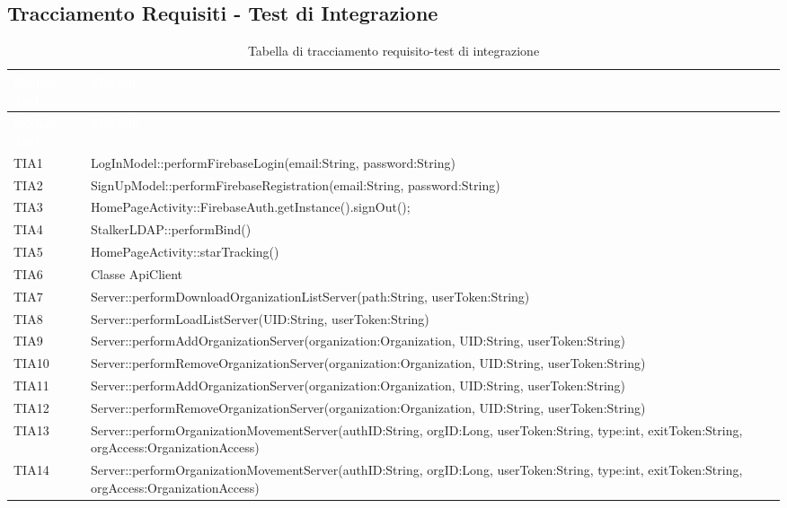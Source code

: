 \subsection{Tracciamento Requisiti - Test di Integrazione}
{
	\renewcommand{\arraystretch}{1.5}
	\centering
	\begin{longtable}{C{2cm} C{12cm}}
	\caption{Tabella di tracciamento requisito-test di integrazione}\\
	\textcolor{white}{\textbf{Codice Test}} & \textcolor{white}{\textbf{Metodo}}\\	
	\endfirsthead
	\textcolor{white}{\textbf{Codice Test}} & \textcolor{white}{\textbf{Metodo}}\\	
	\endhead
	
	TIA1 & LogInModel::performFirebaseLogin(email:String, password:String) \\
	TIA2 & SignUpModel::performFirebaseRegistration(email:String, password:String)\\
	TIA3 & HomePageActivity::FirebaseAuth.getInstance().signOut();\\
	TIA4 & StalkerLDAP::performBind()\\
	TIA5 & HomePageActivity::starTracking()\\
	TIA6 & Classe ApiClient\\
	TIA7 & Server::performDownloadOrganizationListServer(path:String, userToken:String)\\
	TIA8 & Server::performLoadListServer(UID:String, userToken:String) \\
	TIA9 & Server::performAddOrganizationServer(organization:Organization, UID:String, userToken:String)\\
	TIA10 & Server::performRemoveOrganizationServer(organization:Organization, UID:String, userToken:String)\\
	TIA11 & Server::performAddOrganizationServer(organization:Organization, UID:String, userToken:String)\\
	TIA12 & Server::performRemoveOrganizationServer(organization:Organization, UID:String, userToken:String)\\
	TIA13 & Server::performOrganizationMovementServer(authID:String, orgID:Long, userToken:String, type:int, exitToken:String, orgAccess:OrganizationAccess)\\
	TIA14 & Server::performOrganizationMovementServer(authID:String, orgID:Long, userToken:String, type:int, exitToken:String, orgAccess:OrganizationAccess)\\

\end{longtable}}
